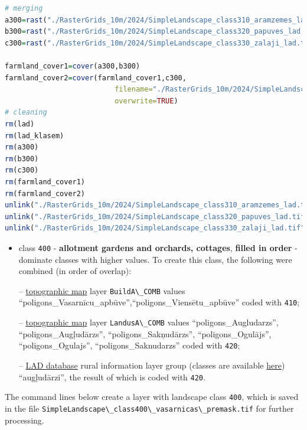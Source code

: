 \documentclass[
]{book}
\newcommand{\passthrough}[1]{#1}
\begin{document}
\begin{lstlisting}[language=R]
# merging
a300=rast("./RasterGrids_10m/2024/SimpleLandscape_class310_aramzemes_lad.tif")
b300=rast("./RasterGrids_10m/2024/SimpleLandscape_class320_papuves_lad.tif")
c300=rast("./RasterGrids_10m/2024/SimpleLandscape_class330_zalaji_lad.tif")

farmland_cover1=cover(a300,b300)
farmland_cover2=cover(farmland_cover1,c300,
                          filename="./RasterGrids_10m/2024/SimpleLandscape_class300_lauki_premask.tif",
                          overwrite=TRUE)
# cleaning
rm(lad)
rm(lad_klasem)
rm(a300)
rm(b300)
rm(c300)
rm(farmland_cover1)
rm(farmland_cover2)
unlink("./RasterGrids_10m/2024/SimpleLandscape_class310_aramzemes_lad.tif")
unlink("./RasterGrids_10m/2024/SimpleLandscape_class320_papuves_lad.tif")
unlink("./RasterGrids_10m/2024/SimpleLandscape_class330_zalaji_lad.tif")
\end{lstlisting}

\begin{itemize}
\item
  class \passthrough{\lstinline!400!} - \textbf{allotment gardens and orchards, cottages}, \textbf{filled in order} -
  dominate classes with higher values. To create this class, the following were
  combined (in order of overlap):

  -- \hyperref[Ch04.04]{topographic map} layer \passthrough{\lstinline!BuildA\_COMB!} values ``poligons\_Vasarnīcu\_apbūve'',``poligons\_Viensētu\_apbūve'' coded with \passthrough{\lstinline!410!};

  -- \hyperref[Ch04.04]{topographic map} layer \passthrough{\lstinline!LandusA\_COMB!} values ``poligons\_Augludarzs'', ``poligons\_Augļudārzs'', ``poligons\_Sakņudārzs'', ``poligons\_Ogulājs'', ``poligons\_Ogulajs'',
  ``poligons\_Saknudarzs'' coded with \passthrough{\lstinline!420!};

  -- \hyperref[Ch04.02]{LAD database} rural information layer group (classes are
  available \href{https://github.com/aavotins/HiQBioDiv_EGVs/blob/main/Data/Geodata/2024/LAD/KulturuKodi_2024.xlsx}{here})
  ``augļudārzi'', the result of which is coded with \passthrough{\lstinline!420!}.
\end{itemize}

The command lines below create a layer with landscape class \passthrough{\lstinline!400!}, which is saved
in the file \passthrough{\lstinline!SimpleLandscape\_class400\_vasarnicas\_premask.tif!} for further
processing.
\end{document}
